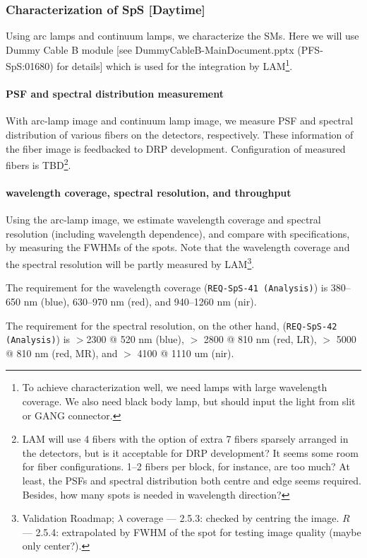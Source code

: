\subsubsection{Characterization of SpS [Daytime]}\label{secflow:SpSchar}

Using arc lamps and continuum lamps, we characterize the SMs.
Here we will use Dummy Cable B module [see DummyCableB-MainDocument.pptx (PFS-SpS:01680) for details] which is used for the integration by LAM\footnote{To achieve characterization well, we need lamps with large wavelength coverage. We also need black body lamp, but should input the light from slit or GANG connector.}.

\paragraph{PSF and spectral distribution measurement}
With arc-lamp image and continuum lamp image, we measure PSF and spectral distribution of various fibers on the detectors, respectively.
These information of the fiber image is feedbacked to DRP development.
Configuration of measured fibers is TBD\footnote{LAM will use 4 fibers with the option of extra 7 fibers sparsely arranged in the detectors, but is it acceptable for DRP development?
It seems some room for fiber configurations.
1--2 fibers per block, for instance,  are too much?
At least, the PSFs and spectral distribution both centre and edge seems required.
Besides, how many spots is needed in wavelength direction?
}.

\paragraph{wavelength coverage, spectral resolution, and throughput}
Using the arc-lamp image, we estimate wavelength coverage and spectral resolution (including wavelength dependence), and compare with specifications, by measuring the FWHMs of the spots.
Note that the wavelength coverage and the spectral resolution will be partly measured by LAM\footnote{Validation Roadmap; $\lambda$ coverage --- 2.5.3: checked by centring the image. $R$ --- 2.5.4: extrapolated by FWHM of the spot for testing image quality (maybe only center?).}.

The requirement for the wavelength coverage ({\tt REQ-SpS-41 (Analysis)}) is 380--650 nm (blue), 630--970 nm (red), and  940--1260 nm (nir).

The requirement for the spectral resolution, on the other hand, ({\tt REQ-SpS-42 (Analysis)}) is $>$2300 @ 520 nm (blue), $>$ 2800 @ 810 nm (red, LR),  $>$ 5000 @ 810 nm (red, MR), and $>$ 4100 @ 1110 um (nir).


